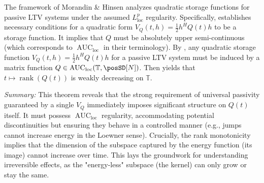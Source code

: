 \documentclass[10pt]{article} %
\newcommand{\timeInt}{\mathbb T}                        %
\newcommand{\loc}{\mathrm{loc}}                         %
\DeclareMathOperator{\AUC}{AUC}                         %
\DeclareMathOperator{\rank}{rank}                       %
\theoremstyle{definition}
\begin{document}
The framework of Morandin \& Hinsen \citep{MorandinHinsen2024} analyzes quadratic storage functions for passive LTV systems under the assumed $L^p_{\loc}$ regularity. Specifically, \citep[Theorem 3.2]{MorandinHinsen2024} establishes necessary conditions for a quadratic form $V_Q(t,h)=\frac{1}{2}h^H Q(t) h$ to be a storage function. It implies that $Q$ must be absolutely upper semi-continuous (which corresponds to $\AUC_{\loc}$ in their terminology). By \citet[Thm.~3.2]{MorandinHinsen2024}, any quadratic storage function $V_Q(t,h)=\tfrac12 h^H Q(t)h$ for a passive LTV system must be induced by a matrix function
$Q\in \AUC_{\loc}(\timeInt,\posSD[N])$.
Then \citet[Thm.~5.4(1)]{MorandinHinsen2024} yields that $t\mapsto \rank(Q(t))$ is weakly decreasing on $\timeInt$.

\textit{Summary:} This theorem reveals that the strong requirement of universal passivity guaranteed by a single $V_Q$ immediately imposes significant structure on $Q(t)$ itself. It must possess $\AUC_{\loc}$ regularity, accommodating potential discontinuities but ensuring they behave in a controlled manner (e.g., jumps cannot increase energy in the Loewner sense). Crucially, the rank monotonicity implies that the dimension of the subspace captured by the energy function (its image) cannot increase over time. This lays the groundwork for understanding irreversible effects, as the "energy-less" subspace (the kernel) can only grow or stay the same.
\end{document}
